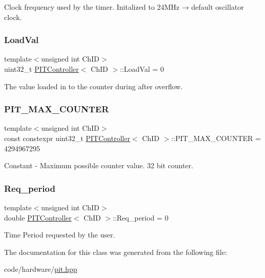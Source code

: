 Clock frequency used by the timer. Initalized to 24\+M\+Hz → default oscillator clock. 

\mbox{\label{classPITController_ad253f0ac646573e5b08e050b6fab5e32}} 
\subsubsection{\texorpdfstring{Load\+Val}{LoadVal}}
{\footnotesize\ttfamily template$<$unsigned int Ch\+ID$>$ \\
uint32\+\_\+t \hyperlink{classPITController}{P\+I\+T\+Controller}$<$ Ch\+ID $>$\+::Load\+Val = 0}



The value loaded in to the counter during after overflow. 

\mbox{\label{classPITController_a53778fe7e47ac9741bef0bc190e0646a}} 
\subsubsection{\texorpdfstring{P\+I\+T\+\_\+\+M\+A\+X\+\_\+\+C\+O\+U\+N\+T\+ER}{PIT\_MAX\_COUNTER}}
{\footnotesize\ttfamily template$<$unsigned int Ch\+ID$>$ \\
const constexpr uint32\+\_\+t \hyperlink{classPITController}{P\+I\+T\+Controller}$<$ Ch\+ID $>$\+::P\+I\+T\+\_\+\+M\+A\+X\+\_\+\+C\+O\+U\+N\+T\+ER = 4294967295\hspace{0.3cm}{\ttfamily [static]}}



Constant -\/ Maximum possible counter value. 32 bit counter. 

\mbox{\label{classPITController_a9de0af49a52145c8d2a8f4e90a519b60}} 
\subsubsection{\texorpdfstring{Req\+\_\+period}{Req\_period}}
{\footnotesize\ttfamily template$<$unsigned int Ch\+ID$>$ \\
double \hyperlink{classPITController}{P\+I\+T\+Controller}$<$ Ch\+ID $>$\+::Req\+\_\+period = 0}



Time Period requested by the user. 



The documentation for this class was generated from the following file\+:\begin{DoxyCompactItemize}
\item 
code/hardware/\hyperlink{pit_8hpp}{pit.\+hpp}\end{DoxyCompactItemize}
